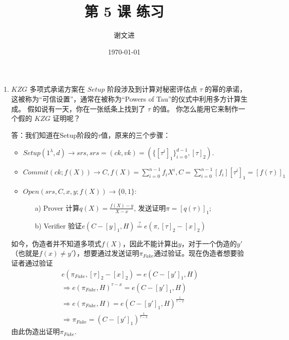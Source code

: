 \documentclass[10pt]{ctexart}
\title{第 5 课 练习}
\author{谢文进}
\date{\today}
\begin{document}
\maketitle

\begin{enumerate}
    \item $KZG$ 多项式承诺方案在 $Setup$ 阶段涉及到计算对秘密评估点 $\tau$ 的幂的承诺，这被称为“可信设置”，通常在被称为“Powers of Tau”的仪式中利用多方计算生成。 假如说有一天，你在一张纸条上找到了 $\tau$ 的值。 你怎么能用它来制作一个假的 $KZG$ 证明呢？

    答：我们知道在Setup阶段的$\tau$值，原来的三个步骤：
    \begin{itemize}
        \item $Setup(1^\lambda,d) \rightarrow srs, srs =(ck,vk)=(\{[\tau^i]_1\}_{i=0}^{d-1},[\tau]_2)$.
        \item $Commit(ck;f(X)) \rightarrow C, f(X) = \sum_{i=0}^{n-1}f_iX^i, C = \sum_{i=0}^{n-1}[f_i][\tau^i]_1=[f(\tau)]_1$
        \item $Open(srs,C,x,y;f(X)) \rightarrow \{0,1\}$:
        \begin{enumerate}
            \item[a)] Prover 计算$q(X)=\frac{f(X)-y}{X-x}$, 发送证明$\pi = [q(\tau)]_1$;
            \item[b)] Verifier 验证$e(C-[y]_1, H) \overset{\text{?}}{=} e(\pi,[\tau]_2-[x]_2)$
        \end{enumerate}
    \end{itemize}
    如今，伪造者并不知道多项式$f(X)$，因此不能计算出$y$，对于一个伪造的$y'$（也就是$f(x) \neq y'$），想要通过发送证明$\pi_{Fake}$通过验证。现在伪造者想要验证者通过验证
    \begin{displaymath}
        \begin{aligned}
            e(\pi_{Fake},[\tau]_2-[x]_2) = e(C-[y']_1, H)\\
            \Rightarrow e(\pi_{Fake}, H)^{\tau - x} = e(C-[y']_1, H)\\
            \Rightarrow e(\pi_{Fake}, H) = e(C-[y']_1, H)^{\frac{1}{\tau - x}}\\
            \Rightarrow \pi_{Fake} = (C-[y']_1)^{\frac{1}{\tau - x}}
        \end{aligned}
    \end{displaymath}
    由此伪造出证明$\pi_{Fake}$.
    

\end{enumerate}
\end{document}
